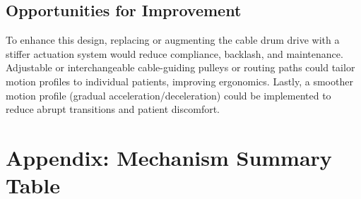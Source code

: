 \documentclass[11pt]{article}
\begin{document}
\subsection{Opportunities for Improvement}
To enhance this design, replacing or augmenting the cable drum drive with a stiffer actuation system would reduce compliance, backlash, and maintenance. Adjustable or interchangeable cable-guiding pulleys or routing paths could tailor motion profiles to individual patients, improving ergonomics. Lastly, a smoother motion profile (gradual acceleration/deceleration) could be implemented to reduce abrupt transitions and patient discomfort.

\clearpage
\section*{Appendix: Mechanism Summary Table}
\end{document}
